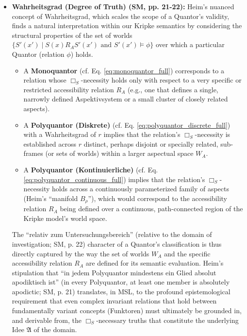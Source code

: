 \documentclass[
    12pt,              %
    a4paper,           %
    headings=normal,   %
    twoside=true,      %
    BCOR=8mm,          %
]{scrbook}
\newcommand{\q}[1]{\enquote{#1}}
\newcommand{\BoxS}{\Box_S}
\begin{document}
\begin{itemize}
    \item   \textbf{Wahrheitsgrad (Degree of Truth) (SM, pp. 21-22):} Heim’s nuanced concept of Wahrheitsgrad, which scales the scope of a Quantor’s validity, finds a natural interpretation within our Kripke semantics by considering the structural properties of the set of worlds \(\{S'(x') \mid S(x) R_A S'(x') \text{ and } S'(x') \vDash \phi \}\) over which a particular Quantor (relation \(\phi\)) holds.
        \begin{itemize}
            \item   A \textbf{Monoquantor} (cf. Eq. \eqref{eq:monoquantor_full}) corresponds to a relation whose \(\BoxS\)-necessity holds only with respect to a very specific or restricted accessibility relation \(R_A\) (e.g., one that defines a single, narrowly defined Aspektivsystem or a small cluster of closely related aspects).
            \item   A \textbf{Polyquantor (Diskrete)} (cf. Eq. \eqref{eq:polyquantor_discrete_full}) with a Wahrheitsgrad of \(r\) implies that the relation's \(\BoxS\)-necessity is established across \(r\) distinct, perhaps disjoint or specially related, sub-frames (or sets of worlds) within a larger aspectual space \(W_A\).
            \item   A \textbf{Polyquantor (Kontinuierliche)} (cf. Eq. \eqref{eq:polyquantor_continuous_full}) implies that the relation's \(\BoxS\)-necessity holds across a continuously parameterized family of aspects (Heim's \q{manifold \(B_\rho\)}), which would correspond to the accessibility relation \(R_A\) being defined over a continuous, path-connected region of the Kripke model's world space.
        \end{itemize}
    The \q{relativ zum Untersuchungsbereich} (relative to the domain of investigation; SM, p. 22) character of a Quantor's classification is thus directly captured by the way the set of worlds \(W_A\) and the specific accessibility relation \(R_A\) are defined for its semantic evaluation. Heim's stipulation that \q{in jedem Polyquantor mindestens ein Glied absolut apodiktisch ist} (in every Polyquantor, at least one member is absolutely apodictic; SM, p. 21) translates, in MSL, to the profound epistemological requirement that even complex invariant relations that hold between fundamentally variant concepts (Funktoren) must ultimately be grounded in, and derivable from, the \(\BoxS\)-necessary truths that constitute the underlying Idee \(\mathfrak{A}\) of the domain.
\end{itemize}
\end{document}
